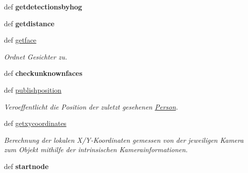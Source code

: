 \begin{DoxyCompactItemize}
\item 
\hypertarget{classpeople2pose_1_1PeopleRec_a2ce5631be953931ae4eb81feb1a10904}{def {\bfseries getdetectionsbyhog}}\label{classpeople2pose_1_1PeopleRec_a2ce5631be953931ae4eb81feb1a10904}

\item 
\hypertarget{classpeople2pose_1_1PeopleRec_ae76454d181c018864af7f2913856a863}{def {\bfseries getdistance}}\label{classpeople2pose_1_1PeopleRec_ae76454d181c018864af7f2913856a863}

\item 
\hypertarget{classpeople2pose_1_1PeopleRec_af864ebeb87868bc9d64d9b2f51961d88}{def \hyperlink{classpeople2pose_1_1PeopleRec_af864ebeb87868bc9d64d9b2f51961d88}{getface}}\label{classpeople2pose_1_1PeopleRec_af864ebeb87868bc9d64d9b2f51961d88}

\begin{DoxyCompactList}\small\item\em Ordnet Gesichter zu. \end{DoxyCompactList}\item 
\hypertarget{classpeople2pose_1_1PeopleRec_af243d4e7f14b11142319766e39703509}{def {\bfseries checkunknownfaces}}\label{classpeople2pose_1_1PeopleRec_af243d4e7f14b11142319766e39703509}

\item 
def \hyperlink{classpeople2pose_1_1PeopleRec_a52bbb028f80993699ccd221ac490adb7}{publishposition}
\begin{DoxyCompactList}\small\item\em Veroeffentlicht die Position der zuletzt gesehenen \hyperlink{classpeople2pose_1_1Person}{Person}. \end{DoxyCompactList}\item 
\hypertarget{classpeople2pose_1_1PeopleRec_a248f21d4ae0febce40fa3d62514e87d9}{def \hyperlink{classpeople2pose_1_1PeopleRec_a248f21d4ae0febce40fa3d62514e87d9}{getxycoordinates}}\label{classpeople2pose_1_1PeopleRec_a248f21d4ae0febce40fa3d62514e87d9}

\begin{DoxyCompactList}\small\item\em Berechnung der lokalen X/\-Y-\/\-Koordinaten gemessen von der jeweiligen Kamera zum Objekt mithilfe der intrinsischen Kamerainformationen. \end{DoxyCompactList}\item 
\hypertarget{classpeople2pose_1_1PeopleRec_abceaea81a52f2cb34732bb7daf3034ce}{def {\bfseries startnode}}\label{classpeople2pose_1_1PeopleRec_abceaea81a52f2cb34732bb7daf3034ce}

\end{DoxyCompactItemize}
